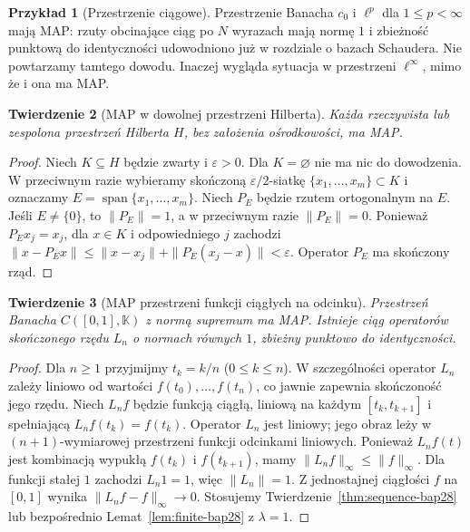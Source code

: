 \documentclass[11pt,a4paper]{article}
\numberwithin{equation}{section}
\theoremstyle{plain}
\newtheorem{twierdzenie}{Twierdzenie}[section]
\theoremstyle{definition}
\newtheorem{przyklad}[twierdzenie]{Przykład}
\theoremstyle{remark}
\newcommand{\K}{\mathbb K}
\begin{document}
\begin{przyklad}[Przestrzenie ciągowe]
\label{ex:sequence-map28}
Przestrzenie Banacha $c_0$ i $\ell^p$ dla
$1\le p<\infty$ mają MAP: rzuty obcinające ciąg
po $N$ wyrazach mają normę $1$ i zbieżność punktową
do identyczności udowodniono już w rozdziale o bazach Schaudera.
Nie powtarzamy tamtego dowodu. Inaczej wygląda sytuacja
w przestrzeni $\ell^\infty$, mimo że i ona ma MAP.
\end{przyklad}

\begin{twierdzenie}[MAP w dowolnej przestrzeni Hilberta]
\label{thm:hilbert-map28}
Każda rzeczywista lub zespolona przestrzeń Hilberta $H$,
bez założenia ośrodkowości, ma MAP.
\end{twierdzenie}
\begin{proof}
Niech $K\subseteq H$ będzie zwarty i $\varepsilon>0$.
Dla $K=\varnothing$ nie ma nic do dowodzenia.
W przeciwnym razie wybieramy skończoną $\varepsilon/2$-siatkę
$\{x_1,\ldots,x_m\}\subset K$ i oznaczamy
$E=\operatorname{span}\{x_1,\ldots,x_m\}$.
Niech $P_E$ będzie rzutem ortogonalnym na $E$.
Jeśli $E\ne\{0\}$, to $\|P_E\|=1$, a w przeciwnym
razie $\|P_E\|=0$. Ponieważ $P_Ex_j=x_j$,
dla $x\in K$ i odpowiedniego $j$ zachodzi
$\|x-P_Ex\|\le\|x-x_j\|+\|P_E(x_j-x)\|
<\varepsilon$. Operator $P_E$ ma skończony rząd.
\end{proof}

\begin{twierdzenie}[MAP przestrzeni funkcji ciągłych na odcinku]
\label{thm:c01-map28}
Przestrzeń Banacha $C([0,1],\K)$ z normą supremum
ma MAP. Istnieje ciąg operatorów skończonego rzędu
$L_n$ o normach równych $1$, zbieżny punktowo do
identyczności.
\end{twierdzenie}
\begin{proof}
Dla $n\ge1$ przyjmijmy $t_k=k/n$ ($0\le k\le n$).
W szczególności operator $L_n$ zależy liniowo od wartości
$f(t_0),\ldots,f(t_n)$, co jawnie zapewnia skończoność jego rzędu.
Niech $L_nf$ będzie funkcją ciągłą, liniową na każdym
$[t_k,t_{k+1}]$ i spełniającą $L_nf(t_k)=f(t_k)$.
Operator $L_n$ jest liniowy; jego obraz leży w
$(n+1)$-wymiarowej przestrzeni funkcji odcinkami liniowych.
Ponieważ $L_nf(t)$ jest kombinacją wypukłą
$f(t_k)$ i $f(t_{k+1})$, mamy
$\|L_nf\|_\infty\le\|f\|_\infty$. Dla funkcji stałej
$1$ zachodzi $L_n1=1$, więc $\|L_n\|=1$.
Z jednostajnej ciągłości $f$ na $[0,1]$ wynika
$\|L_nf-f\|_\infty\to0$. Stosujemy
Twierdzenie~\ref{thm:sequence-bap28} lub bezpośrednio
Lemat~\ref{lem:finite-bap28} z $\lambda=1$.
\end{proof}
\end{document}
